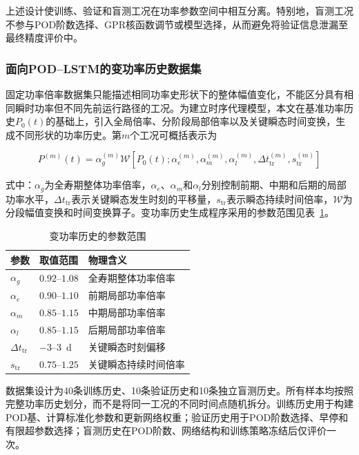 上述设计使训练、验证和盲测工况在功率参数空间中相互分离。特别地，盲测工况不参与POD阶数选择、GPR核函数调节或模型选择，从而避免将验证信息泄漏至最终精度评价中。

\subsubsection{面向POD--LSTM的变功率历史数据集}

固定功率倍率数据集只能描述相同功率史形状下的整体幅值变化，不能区分具有相同瞬时功率但不同先前运行路径的工况。为建立时序代理模型，本文在基准功率历史$P_0(t)$的基础上，引入全局倍率、分阶段局部倍率以及关键瞬态时间变换，生成不同形状的功率历史。第$m$个工况可概括表示为

\begin{equation}
	P^{(m)}(t)
	=
	\alpha_g^{(m)}
	\mathcal{W}
	\left[
	P_0(t);
	\alpha_e^{(m)},
	\alpha_m^{(m)},
	\alpha_l^{(m)},
	\Delta t_{\mathrm{tr}}^{(m)},
	s_{\mathrm{tr}}^{(m)}
	\right]
	\label{eq:formal_variable_power_history}
\end{equation}

式中：$\alpha_g$为全寿期整体功率倍率，$\alpha_e$、$\alpha_m$和$\alpha_l$分别控制前期、中期和后期的局部功率水平，$\Delta t_{\mathrm{tr}}$表示关键瞬态发生时刻的平移量，$s_{\mathrm{tr}}$表示瞬态持续时间倍率，$\mathcal W$为分段幅值变换和时间变换算子。变功率历史生成程序采用的参数范围见表~\ref{tab:formal_power_parameter_ranges}。

\begin{table}[htbp]
	\centering
	\caption{变功率历史的参数范围}
	\label{tab:formal_power_parameter_ranges}
	\begin{tabularx}{\textwidth}
		{XXX}
		\toprule
		参数 & 取值范围 & 物理含义 \\
		\midrule
		$\alpha_g$ & $0.92$--$1.08$ & 全寿期整体功率倍率 \\
		$\alpha_e$ & $0.90$--$1.10$ & 前期局部功率倍率 \\
		$\alpha_m$ & $0.85$--$1.15$ & 中期局部功率倍率 \\
		$\alpha_l$ & $0.85$--$1.15$ & 后期局部功率倍率 \\
		$\Delta t_{\mathrm{tr}}$ & $-3$--$3$~d & 关键瞬态时刻偏移 \\
		$s_{\mathrm{tr}}$ & $0.75$--$1.25$ & 关键瞬态持续时间倍率 \\
		\bottomrule
	\end{tabularx}
\end{table}

数据集设计为40条训练历史、10条验证历史和10条独立盲测历史。所有样本均按照完整功率历史划分，而不是将同一工况的不同时间点随机拆分。训练历史用于构建POD基、计算标准化参数和更新网络权重；验证历史用于POD阶数选择、早停和有限超参数选择；盲测历史在POD阶数、网络结构和训练策略冻结后仅评价一次。

